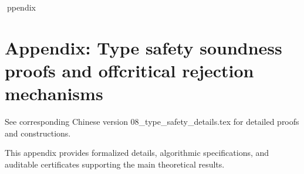 ppendix

\section*{Appendix: Type safety soundness proofs and offcritical rejection mechanisms}

See corresponding Chinese version 08_type_safety_details.tex for detailed proofs and constructions.

This appendix provides formalized details, algorithmic specifications, and auditable certificates supporting the main theoretical results.
